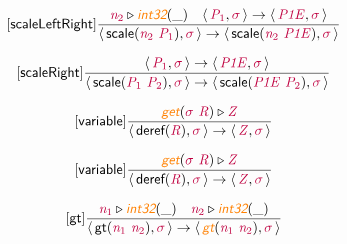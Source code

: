 \documentclass[10pt,leqno,fleqn]{article}
\newcommand{\artVariable}[1]{\mbox{\color{purple}\em #1\/}}
\newcommand{\artConstructor}[1]{\mbox{\sf #1}}
\newcommand{\artSpecial}[1]{\mbox{\color{orange}\sf\em #1}}
\begin{document}
\begin{equation}
\tag*{[\artConstructor{\sf scaleLeftRight}]}
\begin{split}\frac{ \artVariable{n$_{2}$}\triangleright \artSpecial{int32}(\_) \quad \langle\, \artVariable{P$_{1}$}, \artVariable{$\sigma$}\,\rangle \rightarrow \langle\, \artVariable{P1E}, \artVariable{$\sigma$}\,\rangle }{\langle\, \artConstructor{\sf scale}(\artVariable{n$_{2}$}\ \artVariable{P$_{1}$}), \artVariable{$\sigma$}\,\rangle \rightarrow \langle\, \artConstructor{\sf scale}(\artVariable{n$_{2}$}\ \artVariable{P1E}), \artVariable{$\sigma$}\,\rangle }
\end{split}
\end{equation}

\begin{equation}
\tag*{[\artConstructor{\sf scaleRight}]}
\begin{split}\frac{\langle\, \artVariable{P$_{1}$}, \artVariable{$\sigma$}\,\rangle \rightarrow \langle\, \artVariable{P1E}, \artVariable{$\sigma$}\,\rangle }{\langle\, \artConstructor{\sf scale}(\artVariable{P$_{1}$}\ \artVariable{P$_{2}$}), \artVariable{$\sigma$}\,\rangle \rightarrow \langle\, \artConstructor{\sf scale}(\artVariable{P1E}\ \artVariable{P$_{2}$}), \artVariable{$\sigma$}\,\rangle }
\end{split}
\end{equation}

\begin{equation}
\tag*{[\artConstructor{\sf variable}]}
\begin{split}\frac{ \artSpecial{get}(\artVariable{$\sigma$}\ \artVariable{R})\triangleright \artVariable{Z} }{\langle\, \artConstructor{\sf deref}(\artVariable{R}), \artVariable{$\sigma$}\,\rangle \rightarrow \langle\, \artVariable{Z}, \artVariable{$\sigma$}\,\rangle }
\end{split}
\end{equation}

\begin{equation}
\tag*{[\artConstructor{\sf variable}]}
\begin{split}\frac{ \artSpecial{get}(\artVariable{$\sigma$}\ \artVariable{R})\triangleright \artVariable{Z} }{\langle\, \artConstructor{\sf deref}(\artVariable{R}), \artVariable{$\sigma$}\,\rangle \rightarrow \langle\, \artVariable{Z}, \artVariable{$\sigma$}\,\rangle }
\end{split}
\end{equation}

\begin{equation}
\tag*{[\artConstructor{\sf gt}]}
\begin{split}\frac{ \artVariable{n$_{1}$}\triangleright \artSpecial{int32}(\_) \quad  \artVariable{n$_{2}$}\triangleright \artSpecial{int32}(\_) }{\langle\, \artConstructor{\sf gt}(\artVariable{n$_{1}$}\ \artVariable{n$_{2}$}), \artVariable{$\sigma$}\,\rangle \rightarrow \langle\, \artSpecial{gt}(\artVariable{n$_{1}$}\ \artVariable{n$_{2}$}), \artVariable{$\sigma$}\,\rangle }
\end{split}
\end{equation}
\end{document}
